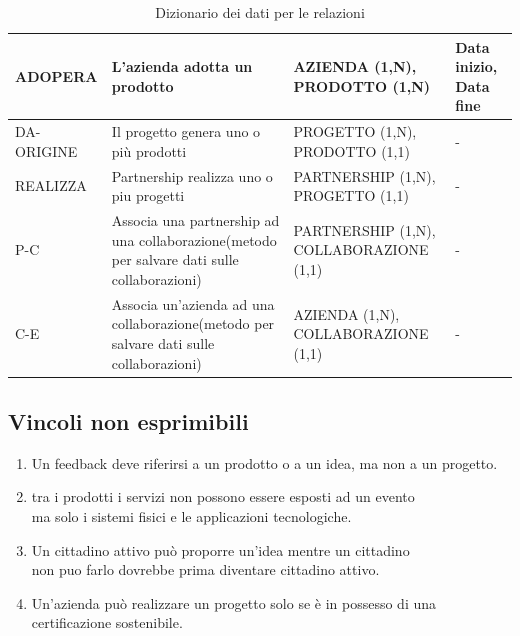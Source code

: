 \documentclass{article}
\begin{document}
\begin{table}[h!]
{\begin{tabular}{|l|p{4cm}|p{6cm}|p{3cm}|}
    ADOPERA & L'azienda adotta un prodotto & AZIENDA (1,N), PRODOTTO (1,N) & Data inizio, Data fine \\
    \hline
    DA-ORIGINE & Il progetto genera uno o più prodotti & PROGETTO (1,N), PRODOTTO (1,1) & - \\
    \hline
    REALIZZA & Partnership realizza uno o piu progetti & PARTNERSHIP (1,N), PROGETTO (1,1) & - \\
    \hline
    P-C & Associa una partnership ad una collaborazione(metodo per salvare dati sulle collaborazioni) & PARTNERSHIP (1,N), COLLABORAZIONE (1,1) & - \\
    \hline
    C-E & Associa un'azienda ad una collaborazione(metodo per salvare dati sulle collaborazioni) & AZIENDA (1,N), COLLABORAZIONE (1,1) & - \\
    \hline
    \end{tabular}%
    }
    \caption{Dizionario dei dati per le relazioni}
\end{table}

\newpage
\subsection{Vincoli non esprimibili}
\begin{par}
    \begin{enumerate}
        \item Un feedback deve riferirsi a un prodotto o a un idea, ma non a un progetto. \\
        \item tra i prodotti i servizi non possono essere esposti ad un evento\\ ma solo i sistemi fisici e le applicazioni tecnologiche. \\
        \item Un cittadino attivo può proporre un'idea mentre un cittadino\\ non puo farlo dovrebbe prima diventare cittadino attivo. \\
        \item Un'azienda può realizzare un progetto solo se è in possesso di una certificazione sostenibile.\\
    \end{enumerate}
    \end{par}
\end{document}
